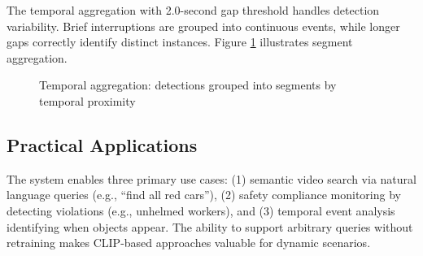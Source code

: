 \documentclass[12pt,a4paper]{article}
\begin{document}
The temporal aggregation with 2.0-second gap threshold handles detection variability. Brief interruptions are grouped into continuous events, while longer gaps correctly identify distinct instances. Figure \ref{fig:temporal} illustrates segment aggregation.

\begin{figure}[H]
\centering
{}
\caption{Temporal aggregation: detections grouped into segments by temporal proximity}
\label{fig:temporal}
\end{figure}

\subsection{Practical Applications}

The system enables three primary use cases: (1) semantic video search via natural language queries (e.g., ``find all red cars''), (2) safety compliance monitoring by detecting violations (e.g., unhelmed workers), and (3) temporal event analysis identifying when objects appear. The ability to support arbitrary queries without retraining makes CLIP-based approaches valuable for dynamic scenarios.
\end{document}
